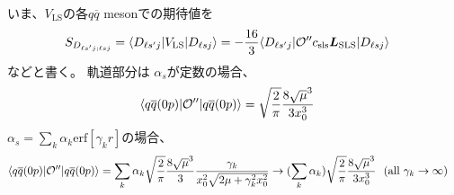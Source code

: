 \documentclass[a4j]{jarticle}
\def\bra{\langle}
\def\ket{\rangle}
\def\calO{{\cal O}}
\def\qbar{\overline{{q}}}
\newcommand{\xbld}[1]{\mbox{\boldmath $#1$}}
\def\vecL{{\xbld{L}}}
\def\Vls{V_\text{LS}}
\def\Lsls{{\vecL_\text{SLS}}}
\begin{document}
いま、$\Vls$の各$q\qbar$ mesonでの期待値を
\begin{align}
S_{D_{\ell s'j;\ell sj}}&=\bra D_{\ell s'j}|\Vls|D_{\ell sj}\ket
=-{16\over 3}\bra D_{\ell s'j}|\calO''c_\text{sls}\Lsls|D_{\ell sj}\ket
\end{align}
などと書く。
軌道部分は $\alpha_s$が定数の場合、
\begin{align}
\bra q\qbar (0p)|\calO''|q\qbar (0p) \ket&=\sqrt{2\over \pi}{8\sqrt{\mu}^3\over 3x_0^3}
\end{align}
$\alpha_s=\sum_k\alpha_k\text{erf}[\gamma_k r]$の場合、
\begin{align}
\bra q\qbar (0p)|\calO''|q\qbar (0p) \ket&=
\sum_k\alpha_k \sqrt{2\over \pi}{8\sqrt{\mu}^3\over 3}
{\gamma_k\over x_0^2\sqrt{2\mu +\gamma_k^2 x_0^2}}
\rightarrow (\sum_k\alpha_k)\sqrt{2\over \pi}{8\sqrt{\mu}^3\over 3x_0^3}~~(\text{all }\gamma_k\rightarrow\infty)
\end{align}
\end{document}
